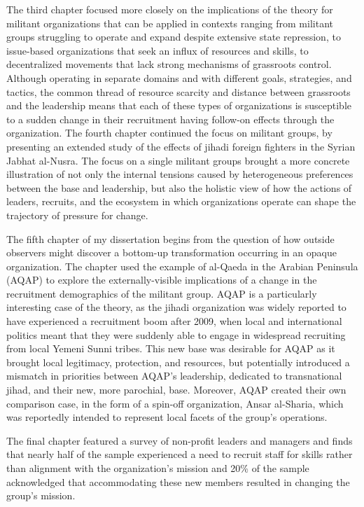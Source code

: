 The third chapter focused more closely on the implications of the theory for militant organizations  that can be applied in contexts ranging from militant groups struggling to operate and expand despite extensive state repression, to issue-based organizations that seek an influx of resources and skills, to decentralized movements that lack strong mechanisms of grassroots control.  Although operating in separate domains and with  different goals, strategies, and tactics, the common thread of resource scarcity and distance between grassroots and the leadership means that each of these types of organizations is susceptible to a sudden change in their recruitment having follow-on effects through the organization. The fourth chapter continued the focus on militant groups, by presenting an extended study of the effects of jihadi foreign fighters in the Syrian Jabhat al-Nusra. The focus on a single militant groups brought a more concrete illustration of not only the internal tensions caused by heterogeneous preferences between the base and leadership, but also the holistic view of how the actions of leaders, recruits, and the ecosystem in which organizations operate can shape the trajectory of pressure for change. 

The fifth chapter of my dissertation begins from the question of how outside observers might discover a bottom-up transformation occurring
in an opaque organization.  The chapter used the example of al-Qaeda in the Arabian Peninsula (AQAP) to explore the externally-visible implications of a change in the recruitment demographics of the militant group. AQAP is a particularly interesting case
of the theory, as the jihadi organization was widely reported to have experienced a recruitment boom after 2009, when local and
international politics meant that they were suddenly able to engage in widespread recruiting from local Yemeni Sunni tribes.  This new base
was desirable for AQAP as it brought local legitimacy, protection, and resources, but potentially introduced a mismatch in priorities between
AQAP's leadership, dedicated to transnational jihad, and their new, more parochial, base.  Moreover, AQAP created their own comparison
case, in the form of a spin-off organization, Ansar al-Sharia, which was reportedly intended to represent local facets of the group's
operations.  

 The final chapter featured a survey of non-profit leaders and managers and finds that nearly half of the sample experienced a need to recruit staff for skills rather than alignment with the organization's mission and 20\% of the sample acknowledged that accommodating these new members resulted in changing the group's mission.

